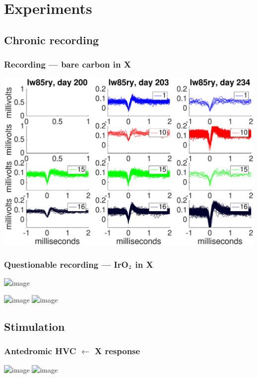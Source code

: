 \documentclass{beamer}
\begin{document}
\section{Experiments}

\subsection{Chronic recording}

\begin{frame}
  \frametitle{Recording --- bare carbon in X}
  \includegraphics[width=\textwidth]{lw85ry_several}
\end{frame}

\begin{frame}
  \frametitle{Questionable recording --- IrO$\textsubscript{2}$ in X}
  \includegraphics<1>[width=\textwidth]{spiketrain-lw95rhp-2015-11-19}
  
  \includegraphics<1>[width=\textwidth]{spiketrain-lw95rhp-2015-11-23}
  \includegraphics<2>[width=\textwidth]{lw95rhp_several}
\end{frame}


\subsection{Stimulation}


\begin{frame}
  \frametitle{Antedromic HVC $\leftarrow$ X response}
  \begin{center}
  \includegraphics<+>[width=0.8\textwidth]{hvc_areaX}
  \includegraphics<+>[width=0.95\textwidth]{plexme}
  \end{center}
\end{frame}
\end{document}
